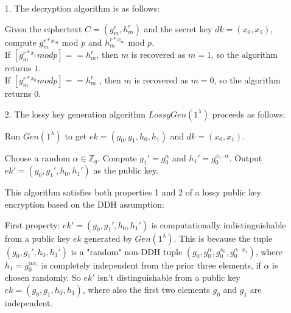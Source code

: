 \begin{itemize}
	\item [1.]
    The decryption algorithm is as follows:


    Given the ciphertext $C=(g_m^r, h_m^r)$ and the secret key $dk=(x_0, x_1)$, compute $g_m^{r * x_m}$ mod $p$ and $h_m^{r *x_m}$ mod $p$.\\
    If $[g_m^{r * x_1} mod p] == h_m^r $, then $m$ is recovered as $m = 1$, so the algorithm returns \(1\).\\
    If $[g_m^{r * x_0} mod p] == h_m^r $
	 , then \(m\) is recovered as \( m = 0\), so the algorithm returns \(0\).

    \item [2.]
    The lossy key generation algorithm $LossyGen(1^\lambda)$ proceeds as follows:

    Run $Gen(1^\lambda)$ to get $ek = (g_0, g_1, h_0, h_1)$ and $dk = (x_0, x_1)$.

    Choose a random $ \alpha \in \mathbb{Z}_q$.
    Compute $g_1' = g_0^\alpha$ and \(h_1' = g_0^{x_1 \cdot \alpha}\).
    Output $ek' = (g_0, g_1', h_0, h_1')$ as the public key.
	

    This algorithm satisfies both properties 1 and 2 of a lossy public key encryption based on the DDH assumption:

    
    First property: 
        $ek' = (g_0, g_1', h_0, h_1')$ is computationally indistinguishable from a public key \(ek\) generated by
        \(Gen(1^\lambda)\).
        This is because the tuple $(g_0, g_1', h_0, h_1')$ is a "random" non-DDH tuple $(g_0, g_0^\alpha, g_0^{x_0}, g_0^{\alpha \cdot x_1})$,
        where $h_1 = g_0^{\alpha x_1}$ is completely independent from the prior three elements, if \(\alpha\) is chosen randomly.
        So \(ek'\) isn't distinguishable from a public key \(ek = (g_0, g_1, h_0, h_1)\), where also the first two elements \(g_0\) and \(g_1\) are independent.
          
    

\end{itemize}
